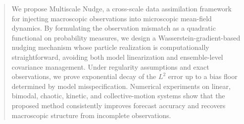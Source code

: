 \begin{abstract}
    We propose Multiscale Nudge, a cross-scale data assimilation framework for injecting macroscopic observations into microscopic mean-field dynamics. By formulating the observation mismatch as a quadratic functional on probability measures, we design a Wasserstein-gradient-based nudging mechanism whose particle realization is computationally straightforward, avoiding both model linearization and ensemble-level covariance management. Under regularity assumptions and exact observations, we prove exponential decay of the $L^2$ error up to a bias floor determined by model misspecification. Numerical experiments on linear, bimodal, chaotic, kinetic, and collective-motion systems show that the proposed method consistently improves forecast accuracy and recovers macroscopic structure from incomplete observations.
\end{abstract}